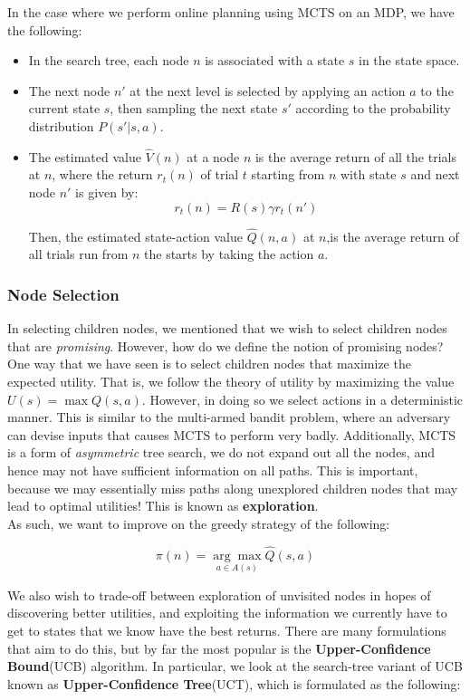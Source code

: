 \documentclass[11pt]{article}
\begin{document}
In the case where we perform online planning using MCTS on an MDP, we have the following:

\begin{itemize}
    \item In the search tree, each node $n$ is associated with a state $s$ in the state space.
    \item The next node $n'$ at the next level is selected by applying an action $a$ to the current state $s$, then sampling the next state $s'$ according to the probability distribution $P(s' | s, a)$.
    \item The estimated value $\hat{V}(n)$ at a node $n$ is the average return of all the trials at $n$, where the return $r_t(n)$ of trial $t$ starting from $n$ with state $s$ and next node $n'$ is given by:
    $$
    r_t(n) = R(s) \gamma r_t(n')
    $$
    
    Then, the estimated state-action value $\hat{Q}(n, a)$ at $n$,is the average return of all trials run from $n$ the starts by taking the action $a$.
\end{itemize}

\subsubsection{Node Selection}

In selecting children nodes, we mentioned that we wish to select children nodes that are \textit{promising}. However, how do we define the notion of promising nodes? One way that we have seen is to select children nodes that maximize the expected utility. That is, we follow the theory of utility by maximizing the value $U(s) = \max Q(s, a)$. However, in doing so we select actions in a deterministic manner. This is similar to the multi-armed bandit problem, where an adversary can devise inputs that causes MCTS to perform very badly. Additionally, MCTS is a form of \textit{asymmetric} tree search, we do not expand out all the nodes, and hence may not have sufficient information on all paths. This is important, because we may essentially miss paths along unexplored children nodes that may lead to optimal utilities! This is known as \textbf{exploration}.\\

As such, we want to improve on the greedy strategy of the following:

$$
\pi(n) = \underset{a \in A(s)}{\arg\max} \hat{Q}(s, a)
$$

We also wish to trade-off between exploration of unvisited nodes in hopes of discovering better utilities, and exploiting the information we currently have to get to states that we know have the best returns. There are many formulations that aim to do this, but by far the most popular is the \textbf{Upper-Confidence Bound}(UCB) algorithm. In particular, we look at the search-tree variant of UCB known as \textbf{Upper-Confidence Tree}(UCT), which is formulated as the following:
\end{document}
